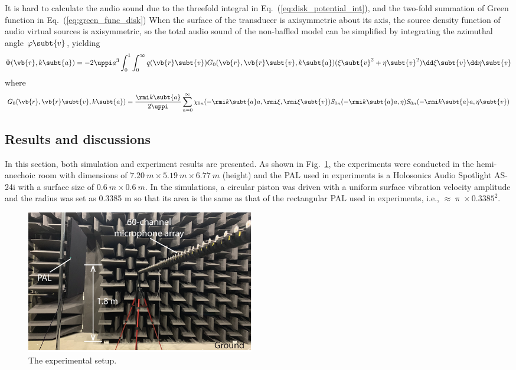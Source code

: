 It is hard to calculate the audio sound due to the threefold integral in Eq.~(\ref{eq:disk_potential_int}),  and the two-fold summation of Green function in Eq.~(\ref{eq:green_func_disk})
When the surface of the transducer is axisymmetric about its axis, the source density function of audio virtual sources is axisymmetric, so the total audio sound of the non-baffled model can be simplified by integrating the azimuthal angle $\varphi\subt{v}$, yielding
\begin{equation}
    \Phi(\vb{r}, k\subt{a})
    = -2\uppi a^3 
    \int_0^1 \int_0^\infty 
    q(\vb{r}\subt{v})
    G_0(\vb{r},\vb{r}\subt{v}, k\subt{a})
    (\xi\subt{v}^2 + \eta\subt{v}^2) \dd \xi\subt{v}\dd\eta\subt{v}
    \label{eq:fdai:w4efjsdofjas}
\end{equation}
where 
\begin{equation}
    G_0(\vb{r},\vb{r}\subt{v},k\subt{a})
    = \frac{\rmi k\subt{a}}{2\uppi}
    \sum_{n=0}^\infty \chi_{0n}(-\rmi k\subt{a}a, \rmi \xi, \rmi \xi\subt{v})
    S_{0n}(-\rmi k\subt{a} a ,\eta )
    S_{0n}(-\rmi k \subt{a} a,\eta\subt{v})
\end{equation}

\subsection{Results and discussions}
In this section, both simulation and experiment results are presented. 
As shown in Fig.~\ref{fig:disk_exp_setup}, the experiments were conducted in the hemi-anechoic room with dimensions of $\SI{7.20}{m} \times \SI{5.19}{m} \times \SI{6.77}{m}$ (height) and the PAL used in experiments is a Holosonics Audio Spotlight AS-24i \cite{HolosonicsAudioSpotlight24i} with a surface size of $\SI{0.6}{m} \times \SI{ 0.6}{ m}$. 
In the simulations, a circular piston was driven with a uniform surface vibration velocity amplitude and the radius was set as 0.3385 m so that its area is the same as that of the rectangular PAL used in experiments, i.e.,  $\approx \uppi \times 0.3385^2$.

\begin{figure}[htb]
    \centering
    \includegraphics[width = 10cm]{fig/exp_setup_211007A_resize.png}
    \caption{The experimental setup.}
    \label{fig:disk_exp_setup}
\end{figure}

